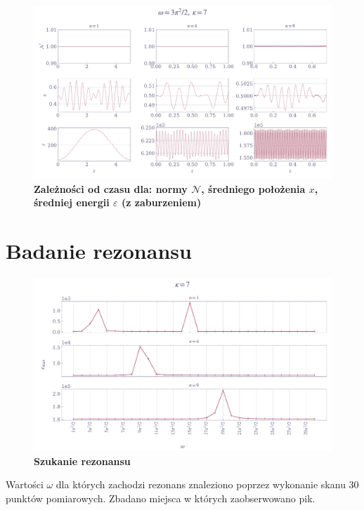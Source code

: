\documentclass[11pt,a4paper]{article}
\begin{document}
\begin{figure}[ht!]
    \caption{\textbf{Zależności od czasu dla: normy $\mathcal{N}$, średniego położenia $x$, średniej energii $\varepsilon$ (z zaburzeniem)}}
    \vspace{0.2cm}
    \includegraphics[width=\linewidth]{../figures/fluctuations.pdf}
\end{figure}
\pagebreak

\section{Badanie rezonansu}

\begin{figure}[ht!]
    \caption{\textbf{Szukanie rezonansu}}
    \vspace{0.2cm}
    \includegraphics[width=\linewidth]{../figures/resonance.pdf}
\end{figure}

Wartości $\omega$ dla których zachodzi rezonans znaleziono poprzez wykonanie skanu 30 punktów pomiarowych. Zbadano miejsca w których zaobserwowano pik.
\end{document}

